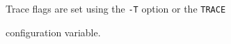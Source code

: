 Trace flags are set using the \texttt{-T} option or the  \texttt{TRACE} 


configuration variable.


















